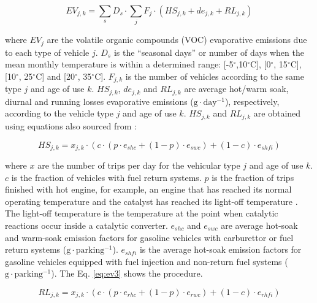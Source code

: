 \documentclass[12pt,graybox,envcountchap,sectrefs]{krantz}
\theoremstyle{definition}
\theoremstyle{definition}
\theoremstyle{definition}
\theoremstyle{remark}
\begin{document}
\begin{equation}
EV_{j,k} =\sum_{s}D_{s} \cdot \sum_{j}F_{j} \cdot (HS_{j,k}+de_{j,k}+RL_{j,k}) 
\label{eq:ev1}
\end{equation}

where \(EV_{j}\) are the volatile organic compounds (VOC) evaporative
emissions due to each type of vehicle \(j\). \(D_s\) is the ``seasonal
days'' or number of days when the mean monthly temperature is within a
determined range: {[}-5\(^{\circ}\),10\(^{\circ}\)C{]},
{[}0\(^{\circ}\), 15\(^{\circ}\)C{]}, {[}10\(^{\circ}\),
25\(^{\circ}\)C{]} and {[}20\(^{\circ}\), 35\(^{\circ}\)C{]}.
\(F_{j,k}\) is the number of vehicles according to the same type \(j\)
and age of use \(k\). \(HS_{j,k}\), \(de_{j,k}\) and \(RL_{j,k}\) are
average hot/warm soak, diurnal and running losses evaporative emissions
(\(\mathrm{g \cdot day^{-1}}\)), respectively, according to the vehicle
type \(j\) and age of use \(k\). \(HS_{j,k}\) and \(RL_{j,k}\) are
obtained using equations also sourced from
\citep{MelliosNtziachristos2016}:

\begin{equation}
HS_{j,k} = x_{j,k} \cdot (c \cdot (p \cdot e_{shc}+(1-p) \cdot e_{swc})+(1-c) \cdot e_{shfi} )
\label{eq:ev2}
\end{equation}

where \(x\) are the number of trips per day for the vehicular type \(j\)
and age of use \(k\). \(c\) is the fraction of vehicles with fuel return
systems. \(p\) is the fraction of trips finished with hot engine, for
example, an engine that has reached its normal operating temperature and
the catalyst has reached its light-off temperature
\citep{NtziachristosSamaras2016}. The light-off temperature is the
temperature at the point when catalytic reactions occur inside a
catalytic converter. \(e_{shc}\) and \(e_{swc}\) are average hot-soak
and warm-soak emission factors for gasoline vehicles with carburettor or
fuel return systems (\(\mathrm{g \cdot parking^{-1}}\)). \(e_{shfi}\) is
the average hot-soak emission factors for gasoline vehicles equipped
with fuel injection and non-return fuel systems
(\(\mathrm{g \cdot parking^{-1}}\)). The Eq. \eqref{eq:ev3} shows the
procedure.

\begin{equation}
RL_{j,k} = x_{j,k} \cdot (c \cdot (p \cdot e_{rhc}+(1-p) \cdot e_{rwc})+(1-c) \cdot e_{rhfi} )
\label{eq:ev3}
\end{equation}
\end{document}
